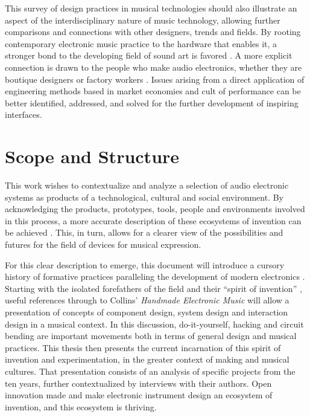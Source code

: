 This survey of design practices in musical technologies should also illustrate an aspect of the interdisciplinary nature of music technology, allowing further comparisons and connections with other designers, trends and fields. By rooting contemporary electronic music practice to the hardware that enables it, a stronger bond to the developing field of sound art is favored \citep{cluett2013}. A more explicit connection is drawn to the people who make audio electronics, whether they are boutique designers or factory workers \citep{rylan2015}.  Issues arising from a direct application of engineering methods based in market economies and cult of performance can be better identified, addressed, and solved for the further development of inspiring interfaces\citep{ghazala2004,christensen2005,Feldman2007,silver2009,perner2011,hertz2012,riis2013,jackson2014}.

\section{Scope and Structure}

This work wishes to contextualize and analyze a selection of audio electronic systems as products of a technological, cultural and social environment. By acknowledging the products, prototypes, tools, people and environments involved in this process, a more accurate description of these ecosystems of invention can be achieved \citep{vinck2003}. This, in turn, allows for a clearer view of the possibilities and futures for the field of devices for musical expression. 
	
For this clear description to emerge, this document will introduce a cursory history of formative practices paralleling the development of modern electronics \citep{holmes2002}. Starting with the isolated forefathers of the field and their ``spirit of invention'' \citep{dunn2001}, useful references through to Collins' \textit{Handmade Electronic Music} will allow a presentation of concepts of component design, system design and interaction design in a musical context. In this discussion, do-it-yourself, hacking and circuit bending are important movements both in terms of general design and musical practices. This thesis then presents the current incarnation of this spirit of invention and experimentation, in the greater context of making and musical cultures. That presentation consists of an analysis of specific projects from the ten years, further contextualized by interviews with their authors. Open innovation made and make electronic instrument design an ecosystem of invention, and this ecosystem is thriving. 

	
	
 


	


